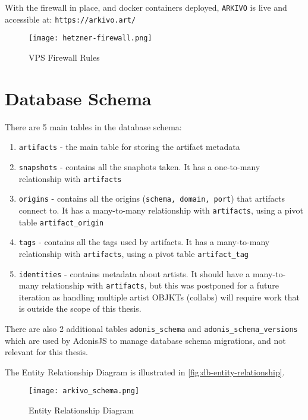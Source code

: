With the firewall in place, and docker containers deployed, \texttt{ARKIVO} is live and accessible at: \texttt{https://arkivo.art/}

\begin{figure}[H]
    \centering
    \texttt{[image: hetzner-firewall.png]}
    \caption[VPS Firewall Rules]{VPS Firewall Rules}
    \label{fig:firewallrules}
\end{figure}


\section{Database Schema}

There are 5 main tables in the database schema:

\begin{enumerate}
	\item \texttt{artifacts} - the main table for storing the artifact metadata
	\item \texttt{snapshots} - contains all the snaphots taken. It has a one-to-many relationship with \texttt{artifacts}
	\item \texttt{origins} - contains all the origins (\texttt{schema, domain, port}) that artifacts connect to. It has a many-to-many relationship with \texttt{artifacts}, using a pivot table \texttt{artifact\_origin}
	\item \texttt{tags} - contains all the tags used by artifacts. It has a many-to-many relationship with \texttt{artifacts}, using a pivot table \texttt{artifact\_tag}
	\item \texttt{identities} - contains metadata about artists. It should have a many-to-many relationship with \texttt{artifacts}, but this was postponed for a future iteration as handling multiple artist OBJKTs (collabs) will require work that is outside the scope of this thesis.
\end{enumerate}

There are also 2 additional tables \texttt{adonis\_schema} and \texttt{adonis\_schema\_versions} which are used by AdonisJS to manage database schema migrations, and not relevant for this thesis.

The Entity Relationship Diagram is illustrated in \autoref{fig:db-entity-relationship}.


\begin{figure}[H]
    \centering
    \texttt{[image: arkivo\_schema.png]}
    \caption[Entity Relationship Diagram]{Entity Relationship Diagram}
    \label{fig:db-entity-relationship}
\end{figure}



